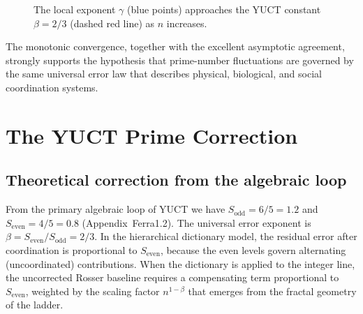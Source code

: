 \documentclass[12pt,a4paper]{article}
\newcommand{\Sodd}{S_{\mathrm{odd}}}
\newcommand{\Seven}{S_{\mathrm{even}}}
\begin{document}
	\begin{figure}[htbp]
		\centering
		\caption{The local exponent \(\gamma\) (blue points) approaches the YUCT constant \(\beta = 2/3\) (dashed red line) as \(n\) increases.}
		\label{fig:gamma-convergence}
	\end{figure}
	
	The monotonic convergence, together with the excellent asymptotic agreement, strongly supports the hypothesis that prime-number fluctuations are governed by the same universal error law that describes physical, biological, and social coordination systems.
	
	\section{The YUCT Prime Correction}
	\subsection{Theoretical correction from the algebraic loop}
	From the primary algebraic loop of YUCT we have \(\Sodd = 6/5 = 1.2\) and \(\Seven = 4/5 = 0.8\) (Appendix~Ferra1.2). The universal error exponent is \(\beta = \Seven/\Sodd = 2/3\). In the hierarchical dictionary model, the residual error after coordination is proportional to \(\Seven\), because the even levels govern alternating (uncoordinated) contributions. When the dictionary is applied to the integer line, the uncorrected Rosser baseline requires a compensating term proportional to \(\Seven\), weighted by the scaling factor \(n^{1-\beta}\) that emerges from the fractal geometry of the ladder.
	
\end{document}
